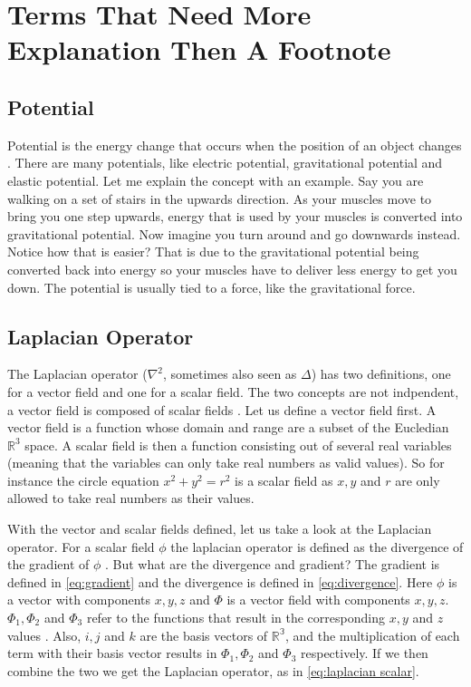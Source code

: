 \appendix
\appendixpage
\section{Terms That Need More Explanation Then A Footnote}
\subsection{Potential} \label{sec:potential}
Potential is the energy change that occurs when the position of an object changes \cite{potential}. There are many potentials, like electric potential, gravitational potential and elastic 
potential. Let me explain the concept with an example. Say you are walking on a set of stairs in the upwards direction. As your muscles move to bring you one step upwards, energy that is used
by your muscles is converted into gravitational potential. Now imagine you turn around and go downwards instead. Notice how that is easier? That is due to the gravitational potential being 
converted back into energy so your muscles have to deliver less energy to get you down. The potential is usually tied to a force, like the gravitational force.

\subsection{Laplacian Operator} \label{sec:laplace}
The Laplacian operator ($\nabla^2$, sometimes also seen as $\Delta$) has two definitions, one for a vector field and one for a scalar field. The two concepts are not indpendent, a vector field 
is composed of scalar fields \cite{vectorscalarfields}. Let us define a vector field first. A vector field is a function whose domain and range are a subset of the Eucledian $\mathbb{R}^3$ space. 
A scalar field is then a function consisting out of several real variables (meaning that the variables can only take real numbers as valid values). So for instance the circle equation 
$x^2 + y^2 = r^2$ is a scalar field as $x, y$ and $r$ are only allowed to take real numbers as their values. 

With the vector and scalar fields defined, let us take a look at the Laplacian operator. For a scalar field $\phi$ the laplacian operator is defined as the divergence of the gradient of $\phi$
\cite{laplacian}. But what are the divergence and gradient? The gradient is defined in \autoref{eq:gradient} and the divergence is defined in \autoref{eq:divergence}. Here $\phi$ is a vector 
with components $x, y, z$ and $\Phi$ is a vector field with components $x, y, z$. $\Phi_1, \Phi_2$ and $\Phi_3$ refer to the functions that result in the corresponding $x, y$ and $z$ values 
\cite{vectorscalarfields}. Also, $i, j$ and $k$ are the basis vectors of $\mathbb{R^3}$, and the multiplication of each term with their basis vector results in $\Phi_1, \Phi_2$ and $\Phi_3$
respectively. If we then combine the two we get the Laplacian operator, as in \autoref{eq:laplacian scalar}.

